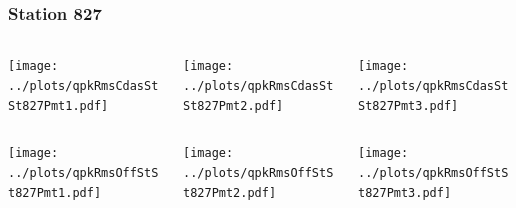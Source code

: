 \documentclass[aspectratio=169]{beamer}
\begin{document}
\begin{frame} 
  \frametitle{Station 827}
  \begin{center}
    \begin{columns}
      \begin{column}{0.33\textwidth}
        \texttt{[image: ../plots/qpkRmsCdasStSt827Pmt1.pdf]}
      \end{column}
      \begin{column}{0.33\textwidth}
        \texttt{[image: ../plots/qpkRmsCdasStSt827Pmt2.pdf]}
      \end{column}
      \begin{column}{0.33\textwidth}
        \texttt{[image: ../plots/qpkRmsCdasStSt827Pmt3.pdf]}
      \end{column}
    \end{columns}
  \end{center}

  \begin{center}
    \begin{columns}
      \begin{column}{0.33\textwidth}
        \texttt{[image: ../plots/qpkRmsOffStSt827Pmt1.pdf]}
      \end{column}
      \begin{column}{0.33\textwidth}
        \texttt{[image: ../plots/qpkRmsOffStSt827Pmt2.pdf]}
      \end{column}
      \begin{column}{0.33\textwidth}
        \texttt{[image: ../plots/qpkRmsOffStSt827Pmt3.pdf]}
      \end{column}
    \end{columns}
  \end{center}
\end{frame}
\end{document}
